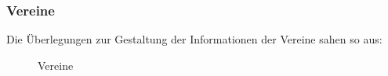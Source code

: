 \FloatBarrier
\subsubsection{Vereine}\label{mockup_vereine}
Die Überlegungen zur Gestaltung der Informationen der Vereine sahen so aus:
\begin{figure}[ht]
\centering
{}
\label{fig:mockup_verein}
\caption{Vereine}
\end{figure}

